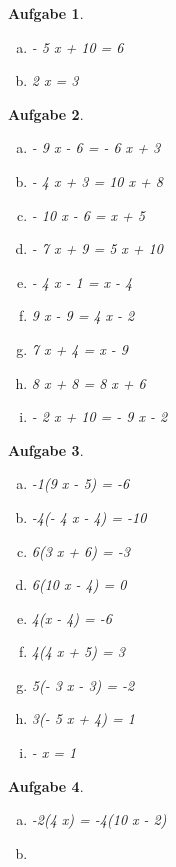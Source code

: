 \documentclass[12pt]{article}
\theoremstyle{aufg}
\newtheorem{aufgabe}{Aufgabe}
\theoremstyle{bsp}
\begin{document}
\begin{flushleft}
\begin{aufgabe}
\begin{multicols}{3}
\begin{enumerate}[a)]
- 10 x - 1 = 8
\item 
- 5 x + 10 = 6
\item 
2 x = 3
\end{enumerate} 
\end{multicols} 
\end{aufgabe} 
\begin{aufgabe} ~ \\ 
\begin{multicols}{3} 
\begin{enumerate}[a)] 
\item 
- 9 x - 6 = - 6 x + 3
\item 
- 4 x + 3 = 10 x + 8
\item 
- 10 x - 6 = x + 5
\item 
- 7 x + 9 = 5 x + 10
\item 
- 4 x - 1 = x - 4
\item 
9 x - 9 = 4 x - 2
\item 
7 x + 4 = x - 9
\item 
8 x + 8 = 8 x + 6
\item 
- 2 x + 10 = - 9 x - 2
\end{enumerate} 
\end{multicols} 
\end{aufgabe} 
\begin{aufgabe} ~ \\ 
\begin{multicols}{3} 
\begin{enumerate}[a)] 
\item 
-1(9 x - 5) = -6
\item 
-4(- 4 x - 4) = -10
\item 
6(3 x + 6) = -3
\item 
6(10 x - 4) = 0
\item 
4(x - 4) = -6
\item 
4(4 x + 5) = 3
\item 
5(- 3 x - 3) = -2
\item 
3(- 5 x + 4) = 1
\item 
- x = 1
\end{enumerate} 
\end{multicols} 
\end{aufgabe} 
\begin{aufgabe} ~ \\ 
\begin{multicols}{2} 
\begin{enumerate}[a)] 
\item 
-2(4 x) = -4(10 x - 2)
\item 

\end{enumerate}
\end{multicols}
\end{aufgabe}
\end{flushleft}
\end{document}
